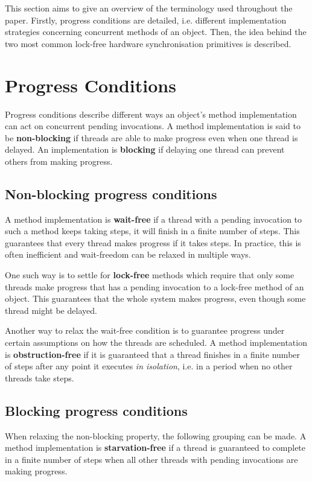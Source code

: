 This section aims to give an overview of the terminology used throughout the paper. Firstly, progress conditions are detailed, i.e. different implementation strategies concerning concurrent methods of an object. Then, the idea behind the two most common lock-free hardware synchronisation primitives is described.

\section{Progress Conditions}
Progress conditions describe different ways an object's method implementation can act on concurrent pending invocations. A method implementation is said to be \textbf{non-blocking} if threads are able to make progress even when one thread is delayed\cite{book}. An implementation is \textbf{blocking} if delaying one thread can prevent others from making progress\cite{book}.

\subsection{Non-blocking progress conditions}
A method implementation is \textbf{wait-free} if a thread with a pending invocation to such a method keeps taking steps, it will finish in a finite number of steps. This guarantees that every thread makes progress if it takes steps\cite{book}. In practice, this is often inefficient and wait-freedom can be relaxed in multiple ways.

One such way is to settle for \textbf{lock-free} methods which require that only some threads make progress that has a pending invocation to a lock-free method of an object. This guarantees that the whole system makes progress, even though some thread might be delayed.

Another way to relax the wait-free condition is to guarantee progress under certain assumptions on how the threads are scheduled. A method implementation is \textbf{obstruction-free} if it is guaranteed that a thread finishes in a finite number of steps after any point it executes \textit{in isolation}, i.e. in a period when no other threads take steps.

\subsection{Blocking progress conditions}
When relaxing the non-blocking property, the following grouping can be made. A method implementation is \textbf{starvation-free} if a thread is guaranteed to complete in a finite number of steps when all other threads with pending invocations are making progress.

